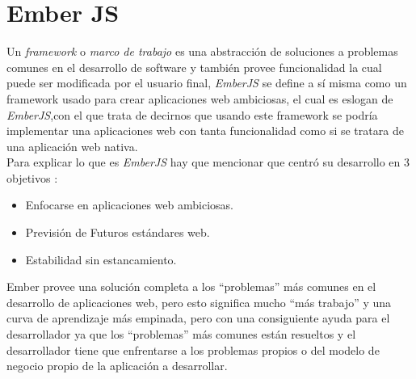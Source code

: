 \section{Ember JS}
\label{sec:ember_js}


Un \emph{framework} o \emph{marco de trabajo} es una abstracción de soluciones a problemas comunes en el desarrollo de software y también provee funcionalidad la cual puede ser modificada por el usuario final, \emph{EmberJS} se define a sí misma como un framework usado para crear aplicaciones web ambiciosas, el cual es eslogan de \emph{EmberJS},con el que trata de decirnos que usando este framework se podría implementar una aplicaciones web con tanta funcionalidad como si se tratara de una aplicación web nativa.\\

Para explicar lo que es \emph{EmberJS} hay que mencionar que centró su desarrollo en 3 objetivos \cite{ember_antidote}:

\begin{itemize}
  \item Enfocarse en aplicaciones web ambiciosas. %
  \item Previsión de Futuros estándares web. %
  \item Estabilidad sin estancamiento. %
\end{itemize}

Ember provee una solución completa a los ``problemas'' más comunes en el desarrollo de aplicaciones web, pero esto significa mucho ``más trabajo'' y una curva de aprendizaje más empinada, pero con una consiguiente ayuda para el desarrollador ya que los ``problemas'' más comunes están resueltos y el desarrollador tiene que enfrentarse a los problemas propios o del modelo de negocio propio de la aplicación a desarrollar.\\

